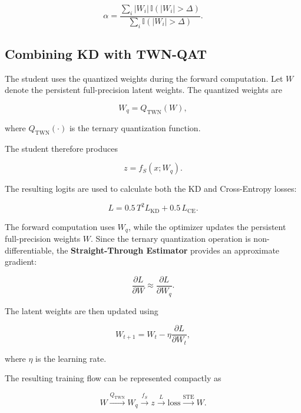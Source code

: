 \documentclass[conference]{IEEEtran}
\begin{document}
\begin{equation}
\alpha =
\frac{
\sum_i |W_i|\,\mathbb{I}(|W_i|>\Delta)
}{
\sum_i \mathbb{I}(|W_i|>\Delta)
}.
\end{equation}

\subsection{Combining KD with TWN-QAT}

The student uses the quantized weights during the forward computation.
Let $W$ denote the persistent full-precision latent weights. The
quantized weights are

\begin{equation}
W_q = Q_{\mathrm{TWN}}(W),
\end{equation}

where $Q_{\mathrm{TWN}}(\cdot)$ is the ternary quantization function.

The student therefore produces

\begin{equation}
z = f_S(x;W_q).
\end{equation}

The resulting logits are used to calculate both the KD and
Cross-Entropy losses:

\begin{equation}
L =
0.5\,T^2L_{\mathrm{KD}}
+
0.5\,L_{\mathrm{CE}}.
\end{equation}

The forward computation uses $W_q$, while the optimizer updates the
persistent full-precision weights $W$. Since the ternary quantization
operation is non-differentiable, the
\textbf{Straight-Through Estimator} provides an approximate gradient:

\begin{equation}
\frac{\partial L}{\partial W}
\approx
\frac{\partial L}{\partial W_q}.
\end{equation}

The latent weights are then updated using

\begin{equation}
W_{t+1}
=
W_t-\eta
\frac{\partial L}{\partial W_t},
\end{equation}

where $\eta$ is the learning rate.

The resulting training flow can be represented compactly as

\begin{equation}
W
\xrightarrow{Q_{\mathrm{TWN}}}
W_q
\xrightarrow{f_S}
z
\xrightarrow{L}
\text{loss}
\xrightarrow{\mathrm{STE}}
W.
\end{equation}
\end{document}
